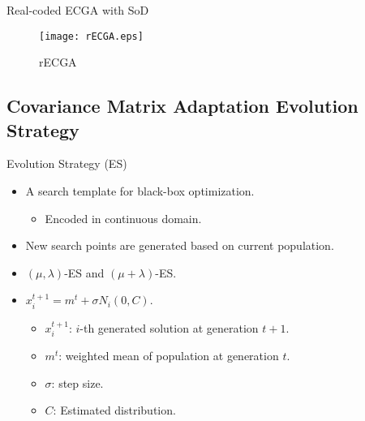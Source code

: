 \begin{frame}{Real-coded ECGA with SoD}
  \vspace*{14pt}
  \begin{figure}
    \flushleft
    
    \texttt{[image: rECGA.eps]}
    \caption{rECGA}
  \end{figure}
\end{frame}

\subsection{Covariance Matrix Adaptation Evolution Strategy}


\begin{frame}{Evolution Strategy (ES)}
  \begin{itemize}
    \item A search template for black-box optimization.
      \begin{itemize}
        \item Encoded in continuous domain.
      \end{itemize}
      \vspace*{14pt}
    \item New search points are generated based on current population.
      \vspace*{14pt}
    \item $(\mu,\lambda)$-ES and $(\mu+\lambda)$-ES.
      \vspace*{14pt}
    \item $x_i^{t+1} = m^t + \sigma N_i(0,C)$.
      \begin{itemize}
        \item $x_i^{t+1}$: $i$-th generated solution at generation $t+1$.
        \item $m^t$: weighted mean of population at generation $t$.
        \item $\sigma$: step size.
        \item $C$: Estimated distribution.
      \end{itemize}
  \end{itemize}
\end{frame}

